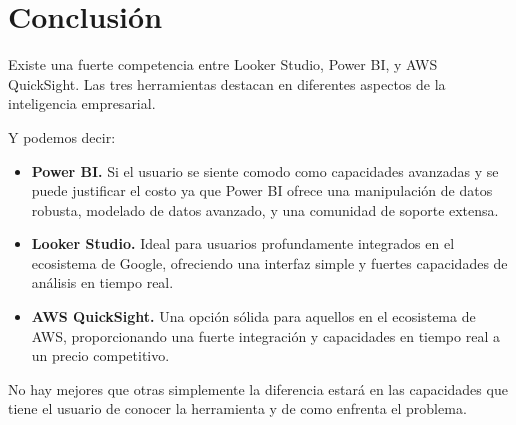 \section{Conclusión}

Existe una fuerte competencia entre Looker Studio, Power BI, y AWS QuickSight. 
Las tres herramientas destacan en diferentes aspectos de la inteligencia empresarial.

Y podemos decir: 
\begin{itemize}
  \item \textbf{Power BI.} Si el usuario se siente comodo como capacidades avanzadas y se puede justificar el costo ya que Power BI ofrece una manipulación de datos robusta, modelado de datos avanzado, y una comunidad de soporte extensa.
  \item \textbf{Looker Studio.} Ideal para usuarios profundamente integrados en el ecosistema de Google, ofreciendo una interfaz simple y fuertes capacidades de análisis en tiempo real.
  \item \textbf{AWS QuickSight.} Una opción sólida para aquellos en el ecosistema de AWS, proporcionando una fuerte integración y capacidades en tiempo real a un precio competitivo.
\end{itemize}
No hay mejores que otras simplemente la diferencia estará en las capacidades que tiene el usuario de conocer la herramienta y de como enfrenta el problema.
